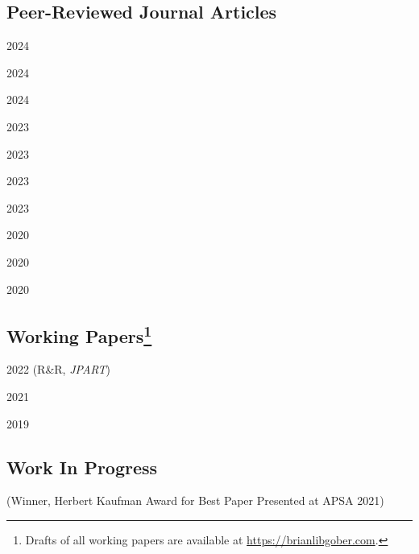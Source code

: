 \documentclass[12pt,letterpaper]{report}
\begin{document}
    \subsection*{Peer-Reviewed Journal Articles}
    \begin{tablist}
     \item[2024] \tab{}
     \item[2024] \tab{}
     \item[2024] \tab{}
     \item[2023] \tab{}
    \item[2023]	\tab{}
    \item[2023] \tab{}
    \item[2023] \tab{}
    \item[2020] \tab{}
    \item[2020] \tab{}
    \item[2020] \tab{}
    \end{tablist}
    
    \subsection*{Working Papers\footnote[2]{Drafts of all working papers are available at \href{https://brianlibgober.com}{https://brianlibgober.com}.}}
    \begin{tablist}
	\item[\the\year] \tab{}
    \item[2022] \tab{}  (R\&R, \textit{JPART}) %

    \item[2021] \tab{}
    \item[2019] \tab{}
    \end{tablist}
    
    \subsection*{Work In Progress}
    
    \begin{tablist}
    \item[\the\year] \tab{}
    \item[\the\year] \tab{} (Winner, Herbert Kaufman Award for Best Paper Presented at APSA 2021)
    \item[\the\year] \tab{}
    \end{tablist}
\end{document}
